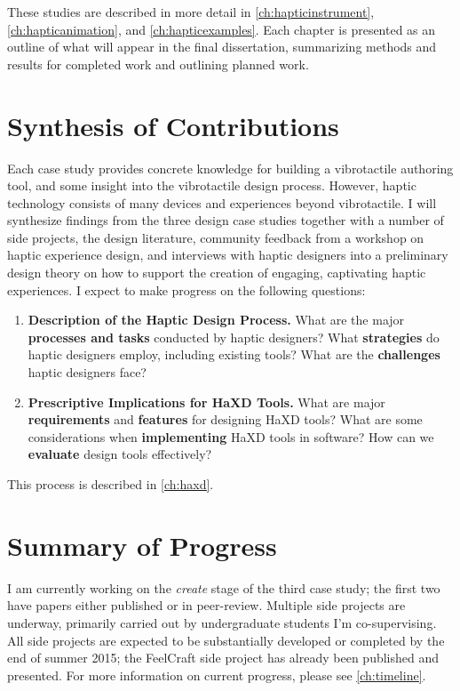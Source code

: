 These studies are described in more detail in \autoref{ch:hapticinstrument},  \autoref{ch:hapticanimation}, and \autoref{ch:hapticexamples}.
Each chapter is presented as an outline of what will appear in the final dissertation, summarizing methods and results for completed work and outlining planned work.


\section{Synthesis of Contributions}

Each case study provides concrete knowledge for building a vibrotactile authoring tool, and some insight into the vibrotactile design process.
However, haptic technology consists of many devices and experiences beyond vibrotactile.
I will synthesize findings from the three design case studies together with a number of side projects, the design literature, community feedback from a workshop on haptic experience design, and interviews with haptic designers into a preliminary design theory on how to support the creation of engaging, captivating haptic experiences.
I expect to make progress on the following questions:
\begin{enumerate}
    \item \textbf{Description of the Haptic Design Process.}
    What are the major \textbf{processes and tasks} conducted by haptic designers?
    What \textbf{strategies} do haptic designers employ, including existing tools?
    What are the \textbf{challenges} haptic designers face?
    
    
    \item \textbf{Prescriptive Implications for HaXD Tools.}
    What are major \textbf{requirements} and \textbf{features} for designing HaXD tools?
    What are some considerations when \textbf{implementing} HaXD tools in software?
    How can we \textbf{evaluate} design tools effectively?
\end{enumerate}

This process is described in \autoref{ch:haxd}.


\section{Summary of Progress}

I am currently working on the \emph{create} stage of the third case study; the first two have papers either published or in peer-review.
Multiple side projects are underway, primarily  carried out by undergraduate students I'm co-supervising.
All side projects are expected to be substantially developed or completed by the end of summer 2015; the FeelCraft side project has already been published and presented.
For more information on current progress, please see \autoref{ch:timeline}.


